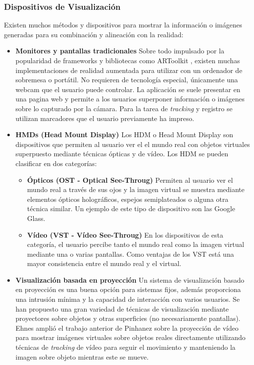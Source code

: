 \subsubsection{Dispositivos  de Visualización}
Existen  muchos métodos y dispositivos para mostrar la información o imágenes generadas para su combinación y alineación con la realidad: 
\begin{itemize}
\item \textbf{Monitores y pantallas tradicionales}
  Sobre todo impulsado por la popularidad de frameworks y bibliotecas como ARToolkit \cite{Kato}, existen muchas implementaciones de realidad aumentada para utilizar con un ordenador de sobremesa o portátil. No requieren de tecnología especial, únicamente una webcam que el usuario puede controlar. La aplicación se suele presentar en una pagina web y permite a los usuarios superponer información o imágenes sobre lo capturado por la cámara. Para la tarea de \textit{tracking} y registro se utilizan marcadores que el usuario previamente ha impreso.
  
\item \textbf{HMDs (Head Mount Display)} Los \acs{HDM} o Head Mount Display son dispositivos que permiten al usuario ver el el mundo real con objetos virtuales superpuesto mediante técnicas ópticas y de vídeo. Los \acs{HDM} se pueden clasificar en dos categorías:
  \begin{itemize}
  \item \textbf{Ópticos (OST - Optical See-Throug)} Permiten al usuario ver el mundo real a través de sus ojos y la imagen virtual se muestra mediante elementos ópticos holográficos, espejos semiplateados o alguna otra técnica similar. Un ejemplo de este tipo de dispositivo son las Google Glass.
    
  \item \textbf{Vídeo (VST - Vídeo See-Throug)} En los dispositivos de esta categoría, el usuario percibe tanto el mundo real como la imagen virtual mediante una o varias pantallas. Como ventajas de los VST está una mayor consistencia entre el mundo real y el virtual.
  \end{itemize}
  
\item \textbf{Visualización basada en proyección}
  Un sistema de visualización basado en proyección es una buena opción para sistemas fijos, además proporciona una intrusión mínima y la capacidad de interacción con varios usuarios.
  Se han propuesto una gran variedad de técnicas de visualización mediante proyectores sobre objetos y otras superficies (no necesariamente pantallas). Ehnes \cite{Ehnes} amplió el trabajo anterior de Pinhanez \cite{Pinhanez} sobre la proyección de vídeo para mostrar imágenes virtuales sobre objetos reales directamente utilizando técnicas de \textit{tracking} de vídeo para seguir el movimiento y manteniendo la imagen sobre objeto mientras este se mueve.
  

\end{itemize}
